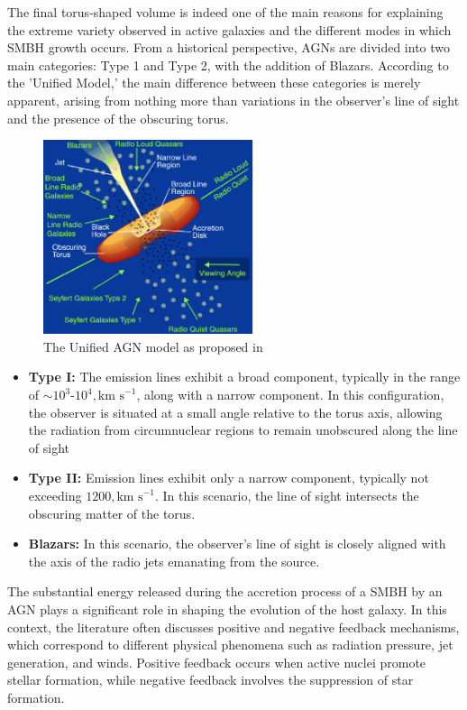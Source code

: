 The final torus-shaped volume is indeed one of the main reasons for explaining the extreme variety observed in active galaxies and the different modes in which SMBH growth occurs. From a historical perspective, AGNs are divided into two main categories: Type 1 and Type 2, with the addition of Blazars. According to the 'Unified Model,' the main difference between these categories is merely apparent, arising from nothing more than variations in the observer's line of sight and the presence of the obscuring torus.

\begin{figure}[b]
  \centering
  \includegraphics[width=0.55\textwidth]{UnifiedAGNmodel}
  \caption{The Unified AGN model as proposed in \cite{1995PASP..107..803U}}
  \label{2}
\end{figure}


\begin{itemize}
  \item \textbf{Type I:} The emission lines exhibit a broad component, typically in the range of $\sim 10^{3}$-$10^{4}, \text{km s}^{-1}$, along with a narrow component. In this configuration, the observer is situated at a small angle relative to the torus axis, allowing the radiation from circumnuclear regions to remain unobscured along the line of sight
  
  \item \textbf{Type II:} Emission lines exhibit only a narrow component, typically not exceeding $1200 , \text{km s}^{-1}$. In this scenario, the line of sight intersects the obscuring matter of the torus.
  
  \item \textbf{Blazars:} In this scenario, the observer's line of sight is closely aligned with the axis of the radio jets emanating from the source.
\end{itemize}

The substantial energy released during the accretion process of a SMBH by an AGN plays a significant role in shaping the evolution of the host galaxy. In this context, the literature often discusses positive and negative feedback mechanisms, which correspond to different physical phenomena such as radiation pressure, jet generation, and winds. Positive feedback occurs when active nuclei promote stellar formation, while negative feedback involves the suppression of star formation.

